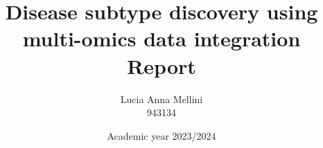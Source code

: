 \documentclass{report}
\begin{document}
\title{\huge{Disease subtype discovery using
multi-omics data integration}\\
\LARGE Report}
\author{Lucia Anna Mellini \\
 943134}
\date{Academic year 2023/2024}
\maketitle

\tableofcontents







\end{document}

